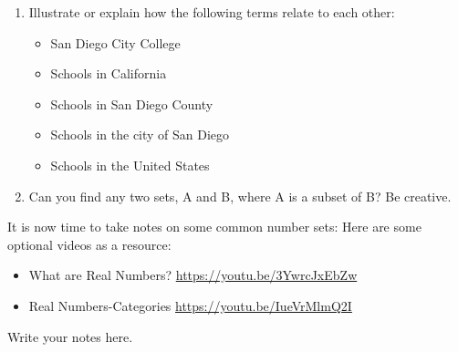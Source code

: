 \documentclass{article}
\begin{document}
\begin{enumerate}[resume]
\item Illustrate or explain how the following terms relate to each other:
  \begin{itemize}
  \item[] San Diego City College
  \item[] Schools in California
  \item[] Schools in San Diego County
  \item[] Schools in the city of San Diego
  \item[] Schools in the United States
  \end{itemize}
\item Can you find any two sets, A and B, where A is a subset of B?  Be creative.
\end{enumerate}

\clearpage

It is now time to take notes on some common number sets:  Here are some optional videos as a resource:

\begin{itemize}
\item What are Real Numbers? \url{https://youtu.be/3YwrcJxEbZw} \hspace{1in} %
\item Real Numbers-Categories \url{https://youtu.be/IueVrMlmQ2I} \hspace{1in} %
\end{itemize}


Write your notes here.

\clearpage
\end{document}
